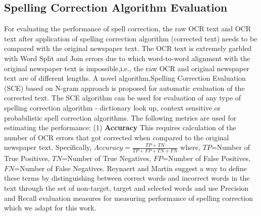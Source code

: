 \documentclass[preprint,11pt]{elsarticle}
\begin{document}
\subsection{Spelling Correction Algorithm Evaluation }
\label{spell:sce}
For evaluating the performance of spell correction, the raw OCR text and OCR text after application of spelling correction algorithm (corrected text) needs to be compared with the original newspaper text. The OCR text is extremely garbled with Word Split and Join errors due to which word-to-word alignment with the original newspaper text is impossible,i.e., the raw OCR and original newspaper text are of different lengths. A novel algorithm,Spelling Correction Evaluation (SCE) based on N-gram approach is proposed for automatic evaluation of the corrected text. %
The SCE algorithm can be used for evaluation of any type of spelling correction algorithm - dictionary look up, context sensitive or probabilistic spell correction algorithms.
The  following metrics are used for estimating the performance:
(1) \textbf{Accuracy }This requires calculation of the number of OCR errors that got corrected when compared to the original newspaper text. Specifically,
$Accuracy=  \frac{TP+TN} {TP+ FP + TN + FN}$ where, $TP$=Number of True Positives, $TN$=Number of True Negatives, $FP$=Number of False Positives, $FN$=Number of False Negatives. %
Reynaert and Martin\cite{reynaert2008all} suggest a way to define these terms by distinguishing between correct words and incorrect words in the text through the set of non-target, target and selected words and use Precision and Recall evaluation measures for measuring performance of spelling correction which we adapt for this work. %
\end{document}
